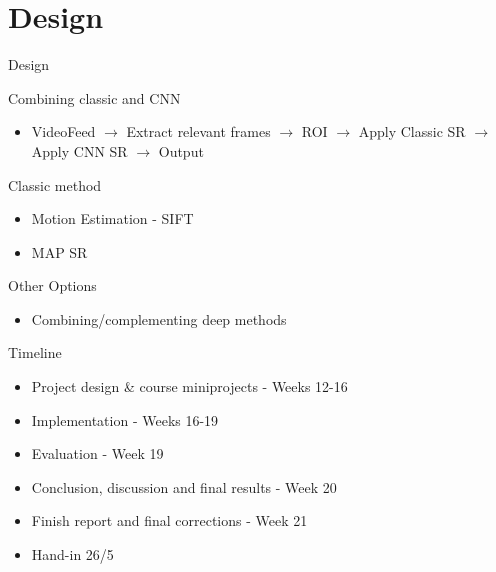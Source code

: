 \section{Design}
\begin{frame}{Design}{}
    \begin{block}{}
        Combining classic and CNN
        \begin{itemize}
            \item VideoFeed $\rightarrow$ Extract relevant frames $\rightarrow$ ROI $\rightarrow$ Apply Classic SR $\rightarrow$ Apply CNN SR $\rightarrow$ Output
        \end{itemize}

        Classic method
        \begin{itemize}
            \item Motion Estimation - SIFT
            \item MAP SR
        \end{itemize}

        Other Options
        \begin{itemize}
            \item Combining/complementing deep methods
        \end{itemize}
    \end{block}
\end{frame}

\begin{frame}{Timeline}{}
    \begin{block}{}
    \begin{itemize}
        \item Project design \& course miniprojects - Weeks 12-16
        \item Implementation - Weeks 16-19 
        \item Evaluation - Week 19
        \item Conclusion, discussion and final results - Week 20
        \item Finish report and final corrections - Week 21
        \item Hand-in 26/5
    \end{itemize}
\end{block}
\end{frame}

